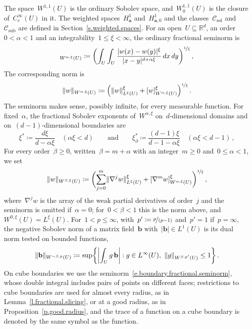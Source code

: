 \documentclass[11pt,letterpaper]{article}
\numberwithin{equation}{section}
\theoremstyle{definition}
\newcommand{\Rd}{\mathbb{R}^d}
\renewcommand{\a}{\mathbf{a}}
\newcommand{\nf}{\nicefrac}
\DeclarePairedDelimiter{\norm}{\lVert}{\rVert}
\newcommand{\Hzero}[1]{H^1_{#1,0}}
\newcommand{\Csol}{\mathcal C_{\mathrm{sol}}}
\newcommand{\Csub}{\mathcal C_{\mathrm{sub}}}
\begin{document}
The space~$W^{1,1}(U)$ is the ordinary Sobolev space, and~$W^{1,1}_0(U)$ is the closure of~$C^\infty_c(U)$ in it. The weighted spaces~$H^1_\a$ and~$\Hzero{\a}$ and the classes~$\Csol$ and~$\Csub$ are defined in Section~\ref{s.weighted.spaces}. For an open~$U\subseteq\Rd$, an order~$0<\alpha<1$ and an integrability~$1\leq\xi<\infty$, the ordinary fractional seminorm is
\begin{equation}
	[w]_{W^{\alpha,\xi}(U)}\coloneqq\biggl(\int_U\int_U\frac{|w(x)-w(y)|^\xi}{|x-y|^{d+\alpha\xi}}\,dx\,dy\biggr)^{\nf1\xi}\,,
	\label{e.fractional.seminorm}
\end{equation}
The corresponding norm is
\begin{equation*}
	\norm{w}_{W^{\alpha,\xi}(U)}\coloneqq\Bigl(\norm{w}_{L^\xi(U)}^\xi+[w]_{W^{\alpha,\xi}(U)}^\xi\Bigr)^{\nf1\xi}\,.
\end{equation*}
The seminorm makes sense, possibly infinite, for every measurable function. For fixed~$\alpha$, the fractional Sobolev exponents of~$W^{\alpha,\xi}$ on~$d$-dimensional domains and on~$(d-1)$-dimensional boundaries are
\begin{equation*}
	\xi^*\coloneqq\frac{d\xi}{d-\alpha\xi}\quad(\alpha\xi<d)\qquad\mbox{and}\qquad\xi_\partial^*\coloneqq\frac{(d-1)\xi}{d-1-\alpha\xi}\quad(\alpha\xi<d-1)\,,
\end{equation*}
For every order~$\beta\geq0$, written~$\beta=m+\alpha$ with an integer~$m\geq0$ and~$0\leq\alpha<1$, we set
\begin{equation*}
	\norm{w}_{W^{\beta,\xi}(U)}\coloneqq\biggl(\sum_{j=0}^m\norm{\nabla^jw}_{L^\xi(U)}^\xi+[\nabla^mw]_{W^{\alpha,\xi}(U)}^\xi\biggr)^{\nf1\xi}\,,
\end{equation*}
where~$\nabla^jw$ is the array of the weak partial derivatives of order~$j$ and the seminorm is omitted if~$\alpha=0$; for~$0<\beta<1$ this is the norm above, and~$W^{0,\xi}(U)=L^\xi(U)$. For~$1<p\leq\infty$, with~$p'\coloneqq\nf p{(p-1)}$ and~$p'=1$ if~$p=\infty$, the negative Sobolev norm of a matrix field~$\mathbf b$ with~$|\mathbf b|\in L^1(U)$ is its dual norm tested on bounded functions,
\begin{equation}
	\norm{\mathbf b}_{W^{-\beta,p}(U)}\coloneqq\sup\biggl\{\biggl|\int_Ug\,\mathbf b\biggr|:g\in L^\infty(U),\ \norm{g}_{W^{\beta,p'}(U)}\leq1\biggr\}\,.
	\label{e.negative.sobolev.norm}
\end{equation}
On cube boundaries we use the seminorm~\eqref{e.boundary.fractional.seminorm}, whose double integral includes pairs of points on different faces; restrictions to cube boundaries are used for almost every radius, as in Lemma~\ref{l.fractional.slicing}, or at a good radius, as in Proposition~\ref{p.good.radius}, and the trace of a function on a cube boundary is denoted by the same symbol as the function.
\end{document}
